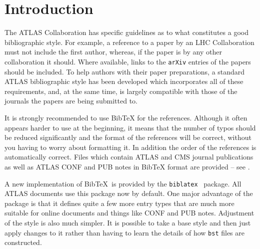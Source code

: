 \documentclass[UKenglish,texlive=2013]{latex/atlasdoc}
\author{Ian C. Brock}
\affil{University of Bonn}
\newcommand*{\BibTeX}{Bib\TeX}
\newcommand{\Package}[1]{\texttt{#1}\xspace}
\begin{document}
 

\maketitle

\section{Introduction}

The ATLAS Collaboration has specific guidelines as to what constitutes a good bibliographic style. 
For example, a reference to a paper by an LHC Collaboration must not include the first author,
whereas, if the paper is by any other collaboration it should. 
Where available, links to the \texttt{arXiv} entries of the papers should be included. 
To help authors with their paper preparations,
a standard ATLAS bibliographic style has been developed which incorporates all of these requirements, 
and, at the same time, is largely compatible with those of the journals the papers are being submitted to. 

It is strongly recommended to use \BibTeX{} for the references. 
Although it often appears harder to use at the beginning, it means that the number of
typos should be reduced significantly and the format of the references
will be correct, without you having to worry about formatting it.
In addition the order of the references is automatically correct.
Files which contain ATLAS and CMS journal publications
as well as ATLAS CONF and PUB notes in \BibTeX{} format are provided -- see \Sect{\ref{sec:atlascmsrefs}}.

A new implementation of \BibTeX\ is provided by the \Package{biblatex}~\cite{biblatex} package.
All ATLAS documents use this package now by default.
One major advantage of the package is that it defines quite a few more entry types
that are much more suitable for online documents and things like CONF and PUB notes.
Adjustment of the style is also much simpler.
It is possible to take a base style and then just apply changes to it rather than
having to learn the details of how \texttt{bst} files are constructed.
\end{document}

